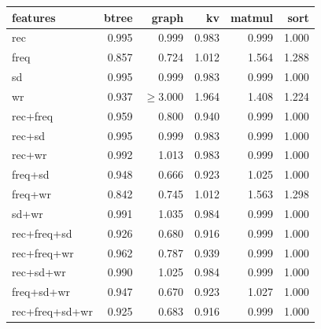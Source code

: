 \begin{tabular}{lrrrrr}
\toprule
features & btree & graph & kv & matmul & sort \\
\midrule
rec & 0.995 & 0.999 & 0.983 & 0.999 & 1.000 \\
freq & 0.857 & 0.724 & 1.012 & 1.564 & 1.288 \\
sd & 0.995 & 0.999 & 0.983 & 0.999 & 1.000 \\
wr & 0.937 & $\geq$3.000 & 1.964 & 1.408 & 1.224 \\
rec{+}freq & 0.959 & 0.800 & 0.940 & 0.999 & 1.000 \\
rec{+}sd & 0.995 & 0.999 & 0.983 & 0.999 & 1.000 \\
rec{+}wr & 0.992 & 1.013 & 0.983 & 0.999 & 1.000 \\
freq{+}sd & 0.948 & 0.666 & 0.923 & 1.025 & 1.000 \\
freq{+}wr & 0.842 & 0.745 & 1.012 & 1.563 & 1.298 \\
sd{+}wr & 0.991 & 1.035 & 0.984 & 0.999 & 1.000 \\
rec{+}freq{+}sd & 0.926 & 0.680 & 0.916 & 0.999 & 1.000 \\
rec{+}freq{+}wr & 0.962 & 0.787 & 0.939 & 0.999 & 1.000 \\
rec{+}sd{+}wr & 0.990 & 1.025 & 0.984 & 0.999 & 1.000 \\
freq{+}sd{+}wr & 0.947 & 0.670 & 0.923 & 1.027 & 1.000 \\
rec{+}freq{+}sd{+}wr & 0.925 & 0.683 & 0.916 & 0.999 & 1.000 \\
\bottomrule
\end{tabular}
